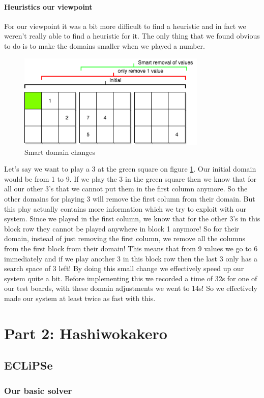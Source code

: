 \documentclass{report}
\newcommand{\mychapter}[2]{
    \setcounter{chapter}{#1}
    \setcounter{section}{0}
    \chapter*{#2}
    \addcontentsline{toc}{chapter}{#2}
}
\begin{document}
\newpage
\subsubsection{Heuristics our viewpoint}
For our viewpoint it was a bit more difficult to find a heuristic and in fact we weren't really able to find a heuristic for it. The only thing that we found obvious to do is to make the domains smaller when we played a number.
\begin{figure}[h!]
\centering
\includegraphics[width=0.8\textwidth]{smartremoval}
\caption{Smart domain changes}
\label{fig:smart_domain}
\end{figure}
Let's say we want to play a 3 at the green square on figure \ref{fig:smart_domain}. Our initial domain would be from 1 to 9. If we play the 3 in the green square then we know that for all our other 3's that we cannot put them in the first column anymore. So the other domains for playing 3 will remove the first column from their domain. But this play actually contains more information which we try to exploit with our system. Since we played in the first column, we know that for the other 3's in this block row they cannot be played anywhere in block 1 anymore! So for their domain, instead of just removing the first column, we remove all the columns from the first block from their domain! This means that from 9 values we go to 6 immediately and if we play another 3 in this block row then the last 3 only has a search space of 3 left! By doing this small change we effectively speed up our system quite a bit. Before implementing this we recorded a time of 32s for one of our test boards, with these domain adjustments we went to 14s! So we effectively made our system at least twice as fast with this.
\mychapter{2}{Part 2: Hashiwokakero}
\label{sec:Hashiwokakero}
\section{ECLiPSe}
\subsection{Our basic solver}
\end{document}
